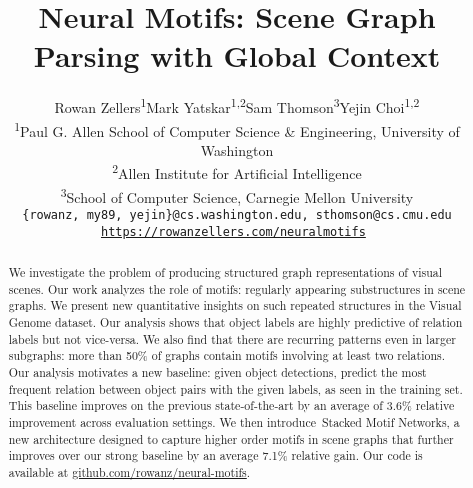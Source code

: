 \documentclass[10pt,twocolumn,letterpaper]{article}
\newcommand{\modellong}{Stacked Motif Network}
\begin{document}
\title{\vspace{-6mm}Neural Motifs: Scene Graph Parsing with Global Context}
\author{Rowan Zellers\textsuperscript{1}\quad Mark Yatskar\textsuperscript{1,2}\quad Sam Thomson\textsuperscript{3}\quad Yejin Choi\textsuperscript{1,2}
	\\ \textsuperscript{1}Paul G. Allen School of Computer Science \& Engineering, University of Washington
	\\ \textsuperscript{2}Allen Institute for Artificial Intelligence
	\\ \textsuperscript{3}School of Computer Science, Carnegie Mellon University \vspace{-1mm}
	\\ {\tt\small \{rowanz, my89, yejin\}@cs.washington.edu, sthomson@cs.cmu.edu}
	\\ \tt\normalsize \href{https://rowanzellers.com/neuralmotifs}{https://rowanzellers.com/neuralmotifs} \vspace{-5mm}
}


\maketitle

\begin{abstract}

We investigate the problem of producing structured graph representations of visual scenes. 
Our work analyzes the role of motifs: regularly appearing substructures in scene graphs.
We present new quantitative insights on such repeated structures in the Visual Genome dataset.
Our analysis shows that object labels are highly predictive of relation labels but not vice-versa.
We also find that there are recurring patterns even in larger subgraphs: more than 50\% of graphs contain motifs involving at least two relations.
Our analysis motivates a new baseline: given object detections, predict the most frequent relation between object pairs with the given labels, as seen in the training set.
This baseline improves on the previous state-of-the-art by an average of 3.6\% relative improvement across evaluation settings. 
We then introduce~{\modellong}s, a new architecture designed to capture higher order motifs in scene graphs that further improves over our strong baseline by an average 7.1\% relative gain.
Our code is available at \href{github.com/rowanz/neural-motifs}{github.com/rowanz/neural-motifs}.
\end{abstract}
\end{document}
